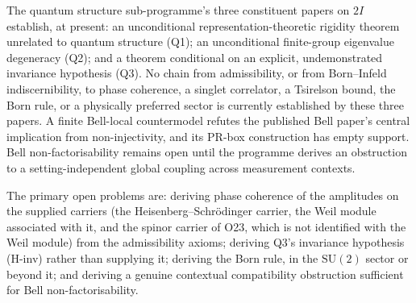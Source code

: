 \documentclass[11pt,a4paper]{article}
\theoremstyle{definition}
\newcommand{\SU}{\mathrm{SU}}
\newcommand{\twoI}{2I}
\begin{document}
    The quantum structure sub-programme's three constituent papers on $\twoI$ establish, at
    present: an unconditional representation-theoretic rigidity theorem unrelated to quantum
    structure (Q1); an unconditional finite-group eigenvalue degeneracy (Q2); and a theorem
    conditional on an explicit, undemonstrated invariance hypothesis (Q3). No chain from
    admissibility, or from Born--Infeld indiscernibility, to phase coherence, a singlet
    correlator, a Tsirelson bound, the Born rule, or a physically preferred sector is currently
    established by these three papers. A finite Bell-local countermodel refutes the published
    Bell paper's central implication from
    non-injectivity, and its PR-box construction has empty support. Bell non-factorisability
    remains open until the programme derives an obstruction to a setting-independent global
    coupling across measurement contexts.

    The primary open problems are: deriving phase coherence of the amplitudes on the supplied carriers (the
    Heisenberg--Schr\"odinger carrier, the Weil module associated with it, and the spinor carrier of O23, which is
    not identified with the Weil module) from the admissibility axioms; deriving Q3's invariance hypothesis
    (H-inv) rather than supplying
    it; deriving the Born rule, in the $\SU(2)$ sector or beyond it; and deriving a genuine
    contextual compatibility obstruction sufficient for Bell non-factorisability.

    \newpage
    
    
\end{document}
